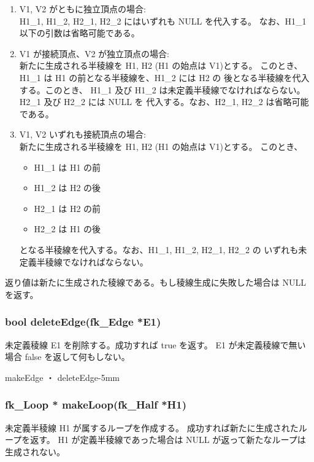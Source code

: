	\begin{enumerate}
	 \item V1, V2 がともに独立頂点の場合: \\
		H1\_1, H1\_2, H2\_1, H2\_2 にはいずれも NULL を代入する。
		なお、H1\_1 以下の引数は省略可能である。

	 \item V1 が接続頂点、V2 が独立頂点の場合: \\
		新たに生成される半稜線を H1, H2 (H1 の始点は V1)とする。
		このとき、H1\_1 は H1 の前となる半稜線を、H1\_2 には H2 の
		後となる半稜線を代入する。このとき、
		H1\_1 及び H1\_2 は未定義半稜線でなければならない。
		H2\_1 及び H2\_2 には NULL を
		代入する。なお、H2\_1, H2\_2 は省略可能である。

	 \item V1, V2 いずれも接続頂点の場合: \\
		新たに生成される半稜線を H1, H2 (H1 の始点は V1)とする。
		このとき、
		\begin{itemize}
		 \item H1\_1 は H1 の前
		 \item H1\_2 は H2 の後
		 \item H2\_1 は H2 の前
		 \item H2\_2 は H1 の後
		\end{itemize}
		となる半稜線を代入する。なお、H1\_1, H1\_2, H2\_1, H2\_2 の
		いずれも未定義半稜線でなければならない。
	\end{enumerate}
	返り値は新たに生成された稜線である。もし稜線生成に失敗した場合は
	NULL を返す。

 \subsubsection*{\hspace*{0.6cm}bool deleteEdge(fk\_Edge *E1)}
   	未定義稜線 E1 を削除する。成功すれば true を返す。
	E1 が未定義稜線で無い場合 false を返して何もしない。

	{makeEdge ・ deleteEdge}{-5mm}

 \subsubsection*{\hspace*{0.6cm}fk\_Loop * makeLoop(fk\_Half *H1)}
	未定義半稜線 H1 が属するループを作成する。
	成功すれば新たに生成されたループを返す。
	H1 が定義半稜線であった場合は NULL が返って新たなループは生成されない。

